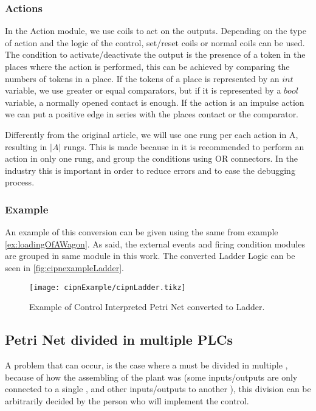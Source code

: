 \subsubsection{Actions}
In the Action module, we use coils to act on the outputs. Depending on the type
of action and the logic of the control, set\slash reset coils or normal coils
can be used. The condition to activate\slash deactivate the output is the
presence of a token in the places where the action is performed, this can be
achieved by comparing the numbers of tokens in a place. If the tokens of a
place is represented by an $int$ variable, we use greater or equal comparators,
but if it is represented by a $bool$ variable, a normally opened contact is
enough. If the action is an impulse action we can put a positive edge in series
with the places contact or the comparator.

Differently from the original article, we will use one rung per
each action in A, resulting in $|A|$ rungs. This is made because in
\cite{renault2017regles} it is recommended to perform an action in only one
rung, and group the conditions using OR connectors.
In the industry this is important in order to reduce errors and to ease the
debugging process.

\subsubsection{Example}

An example of this conversion can be given using the same \CIPN{} from example 
\ref{ex:loadingOfAWagon}. As said, the external events and firing condition
modules are grouped in same module in this work. The converted Ladder Logic
can be seen in \autoref{fig:cipnexampleLadder}.
\begin{figure}[H]
  \centering \texttt{[image: cipnExample/cipnLadder.tikz]}
  \caption[cipnexample]{Example of Control Interpreted Petri Net converted to
    Ladder.}
  \label{fig:cipnexampleLadder}
\end{figure}

\subsection{Petri Net divided in multiple PLCs}
\label{sec:multiplePlcs}
A problem that can occur, is the case where a \CIPN{} must be divided in
multiple \PLCs, because of how the assembling of the plant was (some
inputs\slash outputs are only
connected to a single \PLC, and other inputs\slash outputs to another \PLC),
this division can be arbitrarily decided by the
person who will implement the control.

